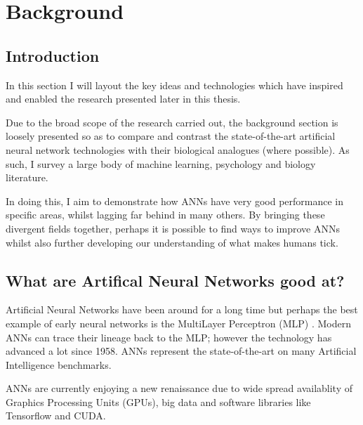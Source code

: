 
\chapter{Background} %

\label{Chapter3} %



\section{Introduction}\label{Lit:Intro}
In this section I will layout the key ideas and technologies which have inspired and enabled the research presented later in this thesis.

Due to the broad scope of the research carried out, the background section is loosely presented so as to compare and contrast the state-of-the-art artificial neural network technologies with their biological analogues (where possible). As such, I survey a large body of machine learning, psychology and biology literature.

In doing this, I aim to demonstrate how ANNs have very good performance in specific areas, whilst lagging far behind in many others. By bringing these divergent fields together, perhaps it is possible to find ways to improve ANNs whilst also further developing our understanding of what makes humans tick. 


\section{What are Artifical Neural Networks good at?}
Artificial Neural Networks have been around for a long time but perhaps the best example of early neural networks is the MultiLayer Perceptron (MLP) \cite{rosenblatt1958perceptron}. Modern ANNs can trace their lineage back to the MLP; however the technology has advanced a lot since 1958. ANNs represent the state-of-the-art on many Artificial Intelligence benchmarks.

ANNs are currently enjoying a new renaissance due to wide spread availablity of Graphics Processing Units (GPUs), big data and software libraries like Tensorflow and CUDA.

